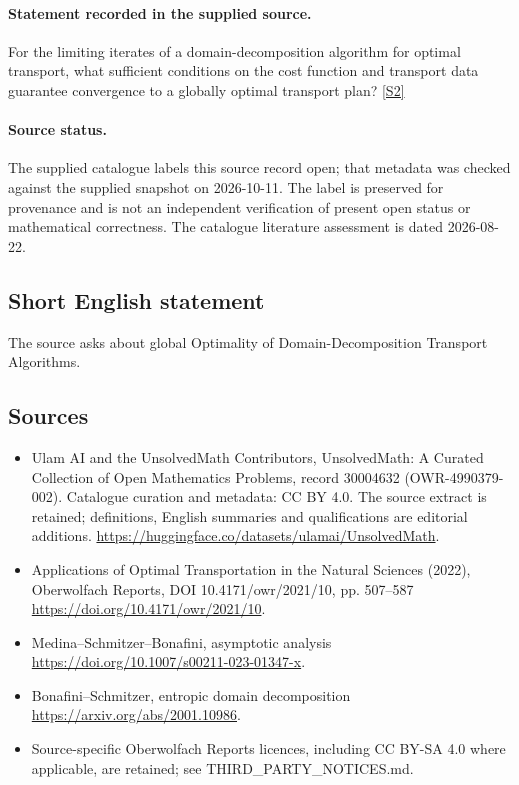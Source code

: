 \documentclass[11pt]{article}
\begin{document}
\paragraph{Statement recorded in the supplied source.}
For the limiting iterates of a domain-decomposition algorithm for optimal transport, what sufficient conditions on the cost function and transport data guarantee convergence to a globally optimal transport plan? \href{https://doi.org/10.4171/owr/2021/10}{[S2]}
\paragraph{Source status.}
The supplied catalogue labels this source record open; that metadata was checked against the supplied snapshot on 2026-10-11. The label is preserved for provenance and is not an independent verification of present open status or mathematical correctness. The catalogue literature assessment is dated 2026-08-22.
\subsection{Short English statement}
The source asks about global Optimality of Domain-Decomposition Transport Algorithms.
\subsection{Sources}
\begin{itemize}
\item[S1] Ulam AI and the UnsolvedMath Contributors, UnsolvedMath: A Curated Collection of Open Mathematics Problems, record 30004632 (OWR-4990379-002). Catalogue curation and metadata: CC BY 4.0. The source extract is retained; definitions, English summaries and qualifications are editorial additions.
\url{https://huggingface.co/datasets/ulamai/UnsolvedMath}.
\item[S2] Applications of Optimal Transportation in the Natural Sciences (2022), Oberwolfach Reports, DOI 10.4171/owr/2021/10, pp. 507--587
\url{https://doi.org/10.4171/owr/2021/10}.
\item[S3] Medina--Schmitzer--Bonafini, asymptotic analysis
\url{https://doi.org/10.1007/s00211-023-01347-x}.
\item[S4] Bonafini--Schmitzer, entropic domain decomposition
\url{https://arxiv.org/abs/2001.10986}.
\item Source-specific Oberwolfach Reports licences, including CC BY-SA 4.0 where applicable, are retained; see THIRD\_PARTY\_NOTICES.md.
\end{itemize}
\end{document}
